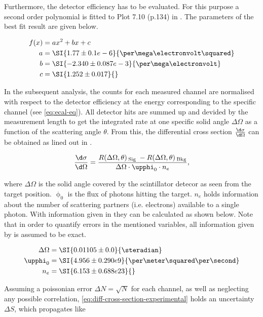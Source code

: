 Furthermore, the detector efficiency has to be evaluated. For this purpose a second
order polynomial is fitted to Plot 7.10 (p.134) in \cite{Sch17}. The parameters of
the best fit result are given below.

\begin{align*}
\label{eq:eq:efficiency-parameters}
	f(x) &= a x^2 + b x + c \\
	a &= \SI{1.77 \pm 0.1 e-6}{\per\mega\electronvolt\squared} \\
	b &= \SI{-2.340 \pm 0.087 e-3}{\per\mega\electronvolt} \\
	c &= \SI{1.252 \pm 0.017}{}
\end{align*}

In the subsequent analysis, the counts for each measured channel are normalised with
respect to the detector efficiency at the energy corresponding to the specific
channel (see \autoref{eq:ecal-eq}). All detector hits are summed up and devided by the 
measurement length to get the integrated rate at one specific solid angle
$\Delta\Omega$ as a function of the scattering angle $\theta$.
From this, the differential cross section $\frac{\d\sigma}{\d\Omega}$ can be obtained
as lined out in \cite{Sch17}.

\begin{equation}
\label{eq:diff-cross-section-experimental}
	\frac{\d\sigma}{\d\Omega} = \frac{R(\Delta\Omega,\theta)\,_\text{Sig}\;-R(\Delta\Omega,\theta)\,_\text{Bkg}}{\Delta\Omega \cdot \upphi_0 \cdot n_e},
\end{equation}

where $\Delta\Omega$ is the solid angle covered by the scintillator detecor as seen
from the target position. $\upphi_0$ is the flux of photons hitting the target. $n_e$
holds information about the number of scattering partners (i.e. electrons) available
to a single photon. With information given in \cite{Sch17} they can be calculated as
shown below. Note that in order to quantify errors in the mentioned variables, all
information given by \cite{Sch17} is assumed to be exact.

\begin{align*}
	\Delta\Omega &= \SI{0.01105 \pm 0.0}{\steradian} \\
	\upphi_0 &= \SI{4.956 \pm 0.290 e9}{\per\meter\squared\per\second} \\
	n_e &= \SI{6.153 \pm 0.688 e23}{} \\
\end{align*}

Assuming a poissonian error $\Delta N = \sqrt{N}$ for each channel, as well as
neglecting any possible correlation, \autoref{eq:diff-cross-section-experimental}
holds an uncertainty $\Delta S$, which propagates like

